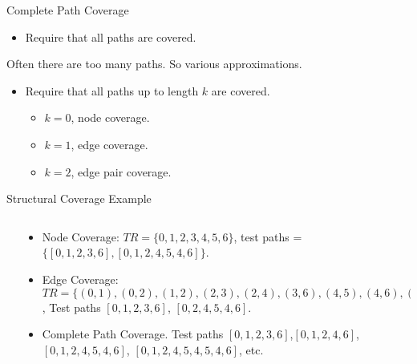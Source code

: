\documentclass[handout]{beamer}
\begin{document}
\begin{frame}{Complete Path Coverage}
  \begin{itemize}
  \item Require that all paths are covered.
  \end{itemize}
  Often there are too many paths. So various approximations.
  \begin{itemize}
  \item Require that all paths up to length $k$ are covered.
    \begin{itemize}
    \item $k=0$, node coverage.
    \item $k=1$, edge coverage.
    \item $k=2$, edge pair coverage.
    \end{itemize}
  \end{itemize}
\end{frame}

 \begin{frame}{Structural Coverage Example}
  \begin{columns}
    \begin{column}{0.2\textwidth}
    \end{column}
    \begin{column}{0.8\textwidth}
      \begin{itemize}
      \item Node Coverage: $TR=\{0,1,2,3,4,5,6\}$, test paths =
        $\{[0,1,2,3,6],[0,1,2,4,5,4,6]\}$.
      \item Edge Coverage:
        $TR=\{(0,1),(0,2),(1,2),(2,3),(2,4),(3,6),(4,5),(4,6),(5,4)\}$,
        Test paths $[0,1,2,3,6]$, $[0,2,4,5,4,6]$.
      \item Complete Path Coverage. Test paths
        $[0,1,2,3,6]$,$[0,1,2,4,6]$,$[0,1,2,4,5,4,6]$, $[0,1,2,4,5,4,5,4,6]$, etc.
      \end{itemize}
    \end{column}
  \end{columns}
\end{frame}
\end{document}
